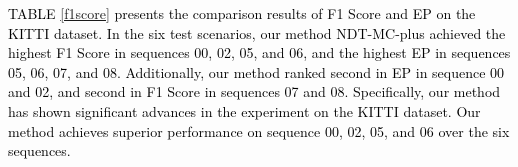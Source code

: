 \documentclass[letterpaper, 10 pt, conference]{ieeeconf}   %
\newcommand\kevin[1]{\textcolor{black}{#1}}
\begin{document}


\kevin{TABLE \ref{f1score} presents the comparison results of F1 Score and EP on the KITTI dataset. In the six test scenarios, our method NDT-MC-plus achieved the highest F1 Score in sequences 00, 02, 05, and 06, and the highest EP in sequences 05, 06, 07, and 08. Additionally, our method ranked second in EP in sequence 00 and 02, and second in F1 Score in sequences 07 and 08. Specifically, our method has shown significant advances in the experiment on the KITTI dataset. Our method achieves superior performance on sequence 00, 02, 05, and 06 over the six sequences.}
\end{document}
